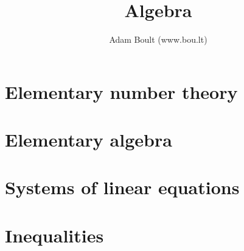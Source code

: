 \documentclass[oneside]{book}
\begin{document}
\author{Adam Boult (www.bou.lt)}
\title{Algebra}
\maketitle

\setcounter{tocdepth}{0}
\tableofcontents



\part{Elementary number theory}






\part{Elementary algebra}





\part{Systems of linear equations}



\part{Inequalities}

\end{document}
